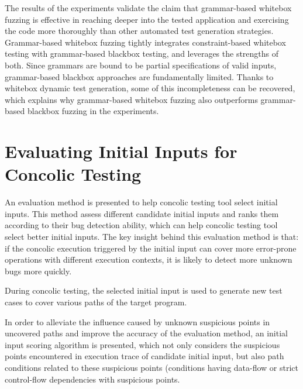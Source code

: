 The results of the experiments validate the claim that grammar-based whitebox fuzzing is effective in reaching deeper into the tested application and exercising the code more thoroughly than other automated test generation strategies.
Grammar-based whitebox fuzzing tightly integrates constraint-based whitebox testing with grammar-based blackbox testing, and leverages the strengths of both.
Since grammars are bound to be partial specifications of valid inputs, grammar-based blackbox approaches are fundamentally limited. Thanks to whitebox dynamic test generation, some of this incompleteness can be recovered, which explains why grammar-based whitebox fuzzing also outperforms grammar-based blackbox fuzzing in the experiments.

\section{Evaluating Initial Inputs for Concolic Testing\cite{wang2015evaluating}}

An evaluation method is presented to help concolic testing tool select initial inputs. 
This method assess different candidate initial inputs and ranks them according to their bug detection ability, which can help concolic testing tool select better initial inputs.
The key insight behind this evaluation method is that: if the concolic execution triggered by the initial input can cover more error-prone operations with different execution contexts, it is likely to detect more unknown bugs more quickly.

During concolic testing, the selected initial input is used to generate new test cases to cover various paths of the target program.

In order to alleviate the influence caused by unknown suspicious points in uncovered paths and improve the accuracy of the evaluation method, an initial input scoring algorithm is presented, which not only considers the suspicious points encountered in execution trace of candidate initial input, but also path conditions related to these suspicious points (conditions having data-flow or strict control-flow dependencies with suspicious points.

